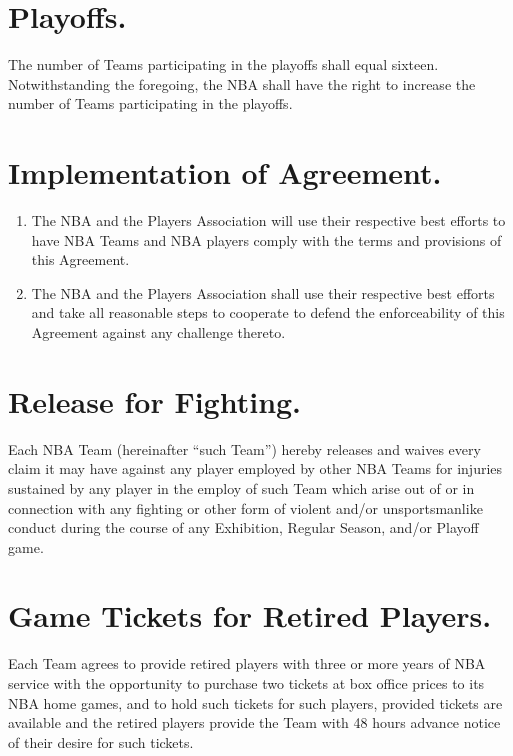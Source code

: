 \documentclass[
]{book}
\providecommand{\tightlist}{%
  \setlength{\itemsep}{0pt}\setlength{\parskip}{0pt}}
\begin{document}
\hypertarget{playoffs.}{%
\section{Playoffs.}\label{playoffs.}}

The number of Teams participating in the playoffs shall equal sixteen. Notwithstanding the foregoing, the NBA shall have the right to increase the number of Teams participating in the playoffs.

\hypertarget{implementation-of-agreement.}{%
\section{Implementation of Agreement.}\label{implementation-of-agreement.}}

\begin{enumerate}
\def\labelenumi{(\alph{enumi})}
\tightlist
\item
  The NBA and the Players Association will use their respective best efforts to have NBA Teams and NBA players comply with the terms and provisions of this Agreement.
\item
  The NBA and the Players Association shall use their respective best efforts and take all reasonable steps to cooperate to defend the enforceability of this Agreement against any challenge thereto.
\end{enumerate}

\hypertarget{release-for-fighting.}{%
\section{Release for Fighting.}\label{release-for-fighting.}}

Each NBA Team (hereinafter ``such Team'') hereby releases and waives every claim it may have against any player employed by other NBA Teams for injuries sustained by any player in the employ of such Team which arise out of or in connection with any fighting or other form of violent and/or unsportsmanlike conduct during the course of any Exhibition, Regular Season, and/or Playoff game.

\hypertarget{game-tickets-for-retired-players.}{%
\section{Game Tickets for Retired Players.}\label{game-tickets-for-retired-players.}}

Each Team agrees to provide retired players with three or more years of NBA service with the opportunity to purchase two tickets at box office prices to its NBA home games, and to hold such tickets for such players, provided tickets are available and the retired players provide the Team with 48 hours advance notice of their desire for such tickets.
\end{document}
